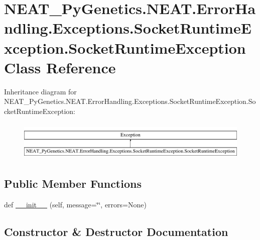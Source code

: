 \hypertarget{classNEAT__PyGenetics_1_1NEAT_1_1ErrorHandling_1_1Exceptions_1_1SocketRuntimeException_1_1SocketRuntimeException}{}\section{N\+E\+A\+T\+\_\+\+Py\+Genetics.\+N\+E\+A\+T.\+Error\+Handling.\+Exceptions.\+Socket\+Runtime\+Exception.\+Socket\+Runtime\+Exception Class Reference}
\label{classNEAT__PyGenetics_1_1NEAT_1_1ErrorHandling_1_1Exceptions_1_1SocketRuntimeException_1_1SocketRuntimeException}
Inheritance diagram for N\+E\+A\+T\+\_\+\+Py\+Genetics.\+N\+E\+A\+T.\+Error\+Handling.\+Exceptions.\+Socket\+Runtime\+Exception.\+Socket\+Runtime\+Exception\+:\begin{figure}[H]
\begin{center}
\leavevmode
\includegraphics[height=1.891892cm]{classNEAT__PyGenetics_1_1NEAT_1_1ErrorHandling_1_1Exceptions_1_1SocketRuntimeException_1_1SocketRuntimeException}
\end{center}
\end{figure}
\subsection*{Public Member Functions}
\begin{DoxyCompactItemize}
\item 
def \hyperlink{classNEAT__PyGenetics_1_1NEAT_1_1ErrorHandling_1_1Exceptions_1_1SocketRuntimeException_1_1SocketRuntimeException_a747071f76bd0ecd08342e4ac9d7a5e33}{\+\_\+\+\_\+init\+\_\+\+\_\+} (self, message=\char`\"{}\char`\"{}, errors=None)
\end{DoxyCompactItemize}


\subsection{Constructor \& Destructor Documentation}

